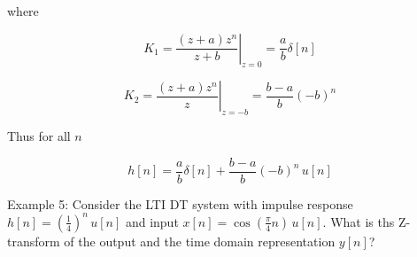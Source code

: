 \documentclass{article}
\begin{document}
where

$$
K_1 = \left. \frac{(z+a)z^n}{z+b} \right|_{z=0} = \frac{a}{b}\delta[n]
$$

$$
K_2 = \left. \frac{(z+a)z^n}{z} \right|_{z=-b} = \frac{b-a}{b} \left(-b\right)^n
$$

Thus for all $n$

$$
h[n] = \frac{a}{b}\delta[n] + \frac{b-a}{b} \left(-b\right)^n\, u[n] 
$$

Example 5: Consider the LTI DT system with impulse response $h[n] = \left(\frac{1}{4}\right)^n\, u[n]$ and input $x[n] = \cos\left(\frac{\pi}{4} n\right)\, u[n]$. What is ths Z-transform of the output and the time domain representation $y[n]$?
\end{document}
